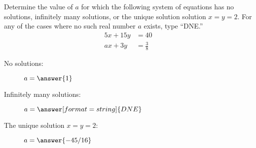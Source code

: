 \documentclass{ximera}
\author{Parisa Fatheddin}
\begin{document}
\begin{exercise}
  Determine the value of $a$ for which the following system of equations has
  no solutions, infinitely many solutions, or the unique solution
  solution $x=y=2$. For any of the cases where no such real number $a$
  exists, type ``DNE.''  %
\begin{align*}
5x+15y &= 40\\ ax +3y &= \frac{3}{8}
\end{align*}
\begin{prompt}
  \begin{description}
    \item[No solutions:] $a= \answer{1}$
    \item[Infinitely many solutions:] $a= \answer[format=string]{DNE}$
    \item[The unique solution $x=y=2$:] $a=\answer{-45/16}$
  \end{description}
\end{prompt}
\end{exercise}
\end{document}
